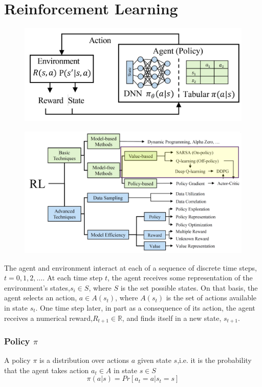 \section{Reinforcement Learning}
\begin{figure}[!h]
    \includegraphics[width = \columnwidth]{figures/13/AgentEnvironment.png}    
\end{figure}
\begin{figure}
    \includegraphics[width = \columnwidth]{figures/13/OverviewRL.png}
\end{figure}
The agent and environment interact at each of a sequence of discrete time steps,\(t = 0,1,2,\dots\).
At each time step \(t\), the agent receives some representation of the environment's states,\(s_i \in S\), where \(S\) is the set possible states.
On that basis, the agent selects an action, \(a\in A(s_t)\), where \(A(s_t)\) is the set of actions available in state \(s_t\).
One time step later, in part as a consequence of its action, the agent receives a numerical reward,\(R_{t+1}\in \mathbb{R}\), and finds itself in a new state, \(s_{t+1}\).
\subsubsection{Policy \(\pi\)}
A policy \(\pi\) is a distribution over actions \(a\) given state \(s\),i.e. it is the probability that the agent takes action \(a_t \in A\) in state \(s \in S\)
\[
\pi(a|s) = Pr\left[a_t = a|s_t = s\right]
\]
